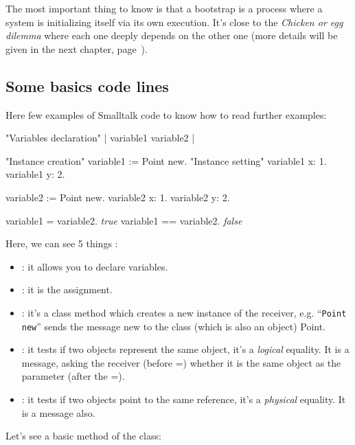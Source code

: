 The most important thing to know is that a bootstrap is a process where a system is initializing itself via its own execution. It's close to the \emph{Chicken or egg dilemma} where each one deeply depends on the other one (more details will be given in the next chapter, page~\pageref{BootStrap}).

\subsection{Some basics code lines}

Here few examples of \gls{Smalltalk} code to know how to read further examples:

\begin{code}{}
	"Variables declaration"
	| variable1 variable2 |

	"Instance creation"
	variable1 := Point new.
	"Instance setting"
	variable1 x: 1.
	variable1 y: 2.
	
	variable2 := Point new.
	variable2 x: 1.
	variable2 y: 2.
	
	variable1 = variable2. \emph{true}
	variable1 == variable2. \emph{false}
\end{code}
Here, we can see 5 things :
\begin{itemize}
	\item \ct{| |} : it allows you to declare variables.
	\item \ct{:=} : it is the assignment.
	\item {} : it's a class method which creates a new instance of the receiver, e.g. ``\texttt{Point new}'' sends the message new to the class (which is also an object) Point.
	\item \ct{=} : it tests if two objects represent the same object, it's a \emph{logical} equality. It is a message, asking the receiver (before =) whether it is the same object as the parameter (after the =).
	\item \ct{==} : it tests if two objects point to the same reference, it's a \emph{physical} equality. It is a message also.
\end{itemize}
Let's see a basic method of the  class:


